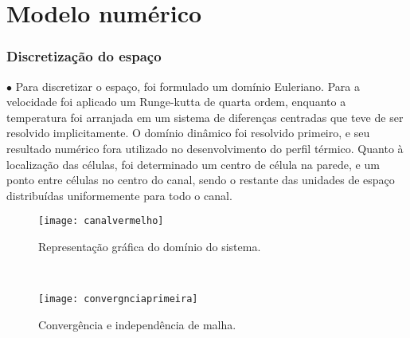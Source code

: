 \documentclass[xcolor=dvipsnames,10pt,aspectratio=169]{beamer}
\begin{document}
	

	
	
	\section{Modelo numérico}
		
	
	
	
		
		\begin{frame}
			\frametitle{Discretização do espaço}
			\begin{minipage}[h!]{0.5\textwidth}
			$\bullet$ Para discretizar o espaço, foi formulado um domínio Euleriano. Para a velocidade foi aplicado um Runge-kutta de quarta ordem, enquanto a temperatura foi arranjada em um sistema de diferenças centradas que teve de ser resolvido implicitamente. O domínio dinâmico foi resolvido primeiro, e seu resultado numérico fora utilizado no desenvolvimento do perfil térmico. Quanto à localização das células, foi determinado um centro de célula na parede, e um ponto entre células no centro do canal, sendo o restante das unidades de espaço distribuídas uniformemente para todo o canal.
			\end{minipage}\hfill
			\begin{minipage}[h!]{0.45\textwidth}
			\begin{figure}
				\centering
				\texttt{[image: canalvermelho]}
				\caption{Representação gráfica do domínio do sistema.}
				\label{temperatura}
			\end{figure}
			\end{minipage}\\
		\end{frame}
	
	
	
	
	
			\begin{frame}
		\begin{figure}
			\centering
			\texttt{[image: convergnciaprimeira]}
			\caption{Convergência e independência de malha.}
			\label{temperatura}
		\end{figure}
	\end{frame}
		
	
	
	
		
\end{document}
